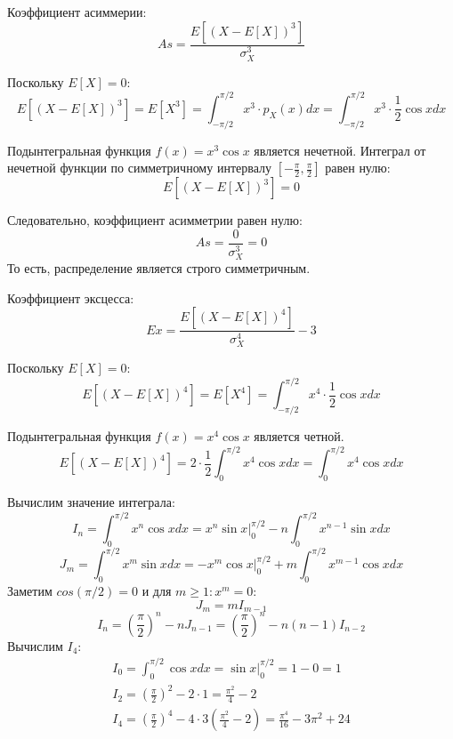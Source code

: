 \documentclass[a4paper,14pt]{extarticle}
\begin{document}
            Коэффициент асиммерии:
            $$
            As = \frac{E[(X - E[X])^3]}{\sigma_X^3}
            $$
            
            Поскольку $E[X] = 0$:
            $$
            E[(X - E[X])^3] = E[X^3] = \int_{-\pi/2}^{\pi/2} x^3 \cdot p_X(x) dx = \int_{-\pi/2}^{\pi/2} x^3 \cdot \frac{1}{2} \cos x dx
            $$
            
            Подынтегральная функция $f(x) = x^3 \cos x$ является нечетной.
            Интеграл от нечетной функции по симметричному интервалу $\left[-\frac{\pi}{2}, \frac{\pi}{2}\right]$ равен нулю:
            $$
            E[(X - E[X])^3] = 0
            $$
            
            Следовательно, коэффициент асимметрии равен нулю:
            $$
            \boxed{As = \frac{0}{\sigma_X^3} = 0}
            $$
            То есть, распределение является строго симметричным.
            
            Коэффициент эксцесса:
            $$
            Ex = \frac{E[(X - E[X])^4]}{\sigma_X^4} - 3
            $$
            
            Поскольку $E[X] = 0$:
            $$
            E[(X - E[X])^4] = E[X^4] = \int_{-\pi/2}^{\pi/2} x^4 \cdot \frac{1}{2} \cos x dx
            $$
            
            Подынтегральная функция $f(x) = x^4 \cos x$ является четной.
            $$
            E[(X - E[X])^4] = 2 \cdot \frac{1}{2} \int_{0}^{\pi/2} x^4 \cos x dx = \int_{0}^{\pi/2} x^4 \cos x dx
            $$
            
            Вычислим значение интеграла:
            $$
            I_{n} =
            \int_{0}^{\pi/2} x^n \cos x dx =
            x^n \sin x |^{\pi/2}_{0} -
            n \int_{0}^{\pi/2} x^{n-1} \sin x dx
            $$
            $$
            J_{m} =
            \int_{0}^{\pi/2} x^m \sin x dx =
            -x^m \cos x |^{\pi/2}_{0} +
            m \int_{0}^{\pi/2} x^{m-1} \cos x dx
            $$
            Заметим $cos(\pi/2) = 0$ и для $m \ge 1: x^m = 0$:
            $$
            J_{m} = m I_{m-1}
            $$
            $$
            I_{n} =
            \left(\frac{\pi}{2}\right)^n - n J_{n-1} =
            \left(\frac{\pi}{2}\right)^n - n (n - 1) I_{n-2}
            $$
            Вычислим $I_4$:
            \begin{gather*}
                I_0 =
                \int_{0}^{\pi/2} \cos x dx =
                \sin x |^{\pi/2}_{0} = 1 - 0 = 1 \\
                I_2 =
                \left(\frac{\pi}{2}\right)^2 - 2 \cdot 1
                = \frac{\pi^2}{4} - 2 \\
                I_4 =
                \left(\frac{\pi}{2}\right)^4 -
                4 \cdot 3 \left(\frac{\pi^2}{4} - 2\right) =
                \frac{\pi^4}{16} - 3\pi^2 + 24
            \end{gather*}
            
\end{document}
